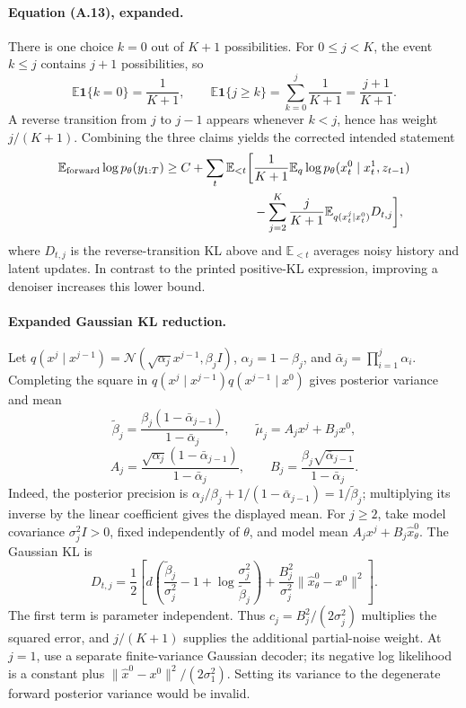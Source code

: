 \paragraph{Equation (A.13), expanded.}
There is one choice $k=0$ out of $K+1$ possibilities. For $0\leq j<K$, the event $k\leq j$ contains $j+1$ possibilities, so
\[
 \mathbb E\mathbf1\{k=0\}=\frac1{K+1},\qquad
 \mathbb E\mathbf1\{j\geq k\}=\sum_{k=0}^j\frac1{K+1}=\frac{j+1}{K+1}.
\]
A reverse transition from $j$ to $j-1$ appears whenever $k<j$, hence has weight $j/(K+1)$. Combining the three claims yields the corrected intended statement
\begin{align*}
 \mathbb E_{\rm forward}\log p_\theta(y_{1:T})\geq C+
 \sum_t\mathbb E_{<t}\biggl[&\frac{1}{K+1}\mathbb E_q\log p_\theta(x_t^0\mid x_t^1,z_{t-1})\\
 &-\sum_{j=2}^K\frac{j}{K+1}\mathbb E_{q(x_t^j\mid x_t^0)}D_{t,j}\biggr],
\end{align*}
where $D_{t,j}$ is the reverse-transition KL above and $\mathbb E_{<t}$ averages noisy history and latent updates. In contrast to the printed positive-KL expression, improving a denoiser increases this lower bound.

\paragraph{Expanded Gaussian KL reduction.}
Let $q(x^j\mid x^{j-1})=\mathcal N(\sqrt{\alpha_j}x^{j-1},\beta_j I)$, $\alpha_j=1-\beta_j$, and $\bar\alpha_j=\prod_{i=1}^j\alpha_i$. Completing the square in
$q(x^j\mid x^{j-1})q(x^{j-1}\mid x^0)$ gives posterior variance and mean
\[
 \widetilde\beta_j=\frac{\beta_j(1-\bar\alpha_{j-1})}{1-\bar\alpha_j},\qquad
 \widetilde\mu_j=A_jx^j+B_jx^0,
\]
\[
 A_j=\frac{\sqrt{\alpha_j}(1-\bar\alpha_{j-1})}{1-\bar\alpha_j},\qquad
 B_j=\frac{\beta_j\sqrt{\bar\alpha_{j-1}}}{1-\bar\alpha_j}.
\]
Indeed, the posterior precision is $\alpha_j/\beta_j+1/(1-\bar\alpha_{j-1})=1/\widetilde\beta_j$; multiplying its inverse by the linear coefficient gives the displayed mean. For $j\geq2$, take model covariance $\sigma_j^2I>0$, fixed independently of $\theta$, and model mean $A_jx^j+B_j\widehat x^0_\theta$. The Gaussian KL is
\[
 D_{t,j}=\frac12\left[d\left(\frac{\widetilde\beta_j}{\sigma_j^2}-1+\log\frac{\sigma_j^2}{\widetilde\beta_j}\right)
 +\frac{B_j^2}{\sigma_j^2}\|\widehat x^0_\theta-x^0\|^2\right].
\]
The first term is parameter independent. Thus $c_j=B_j^2/(2\sigma_j^2)$ multiplies the squared error, and $j/(K+1)$ supplies the additional partial-noise weight. At $j=1$, use a separate finite-variance Gaussian decoder; its negative log likelihood is a constant plus $\|\widehat x^0-x^0\|^2/(2\sigma_1^2)$. Setting its variance to the degenerate forward posterior variance would be invalid.

